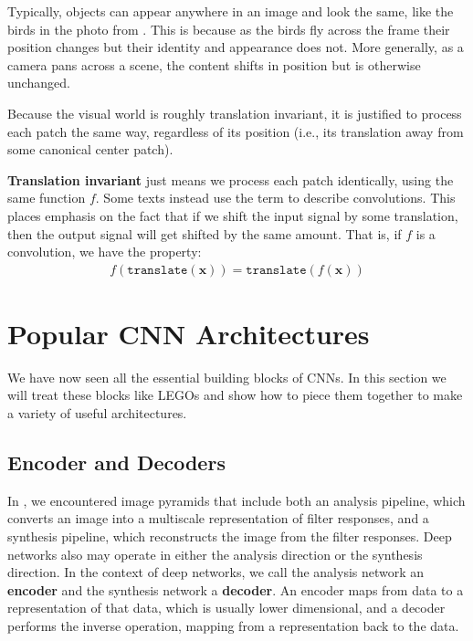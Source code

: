 Typically, objects can appear anywhere in an image and look the same, like the birds in the photo from \fig{\ref{fig:convolutional_neural_nets:CNNs_as_patch_processing}}. This is because as the birds fly across the frame their position changes but their identity and appearance does not. More generally, as a camera pans across a scene, the content shifts in position but is otherwise unchanged.

Because the visual world is roughly translation invariant, it is justified to process each patch the same way, regardless of its position (i.e., its translation away from some canonical center patch).

\textbf{Translation invariant} just means we process each patch identically, using the same function $f$. Some texts instead use the term  to describe convolutions. This places emphasis on the fact that if we shift the input signal by some translation, then the output signal will get shifted by the same amount. That is, if $f$ is a convolution, we have the property:
\begin{align}
    f(\texttt{translate}(\mathbf{x})) = \texttt{translate}(f(\mathbf{x}))
\end{align}



\section{Popular CNN Architectures}
\label{sec:convolutional_neural_nets:popular_architectures}
We have now seen all the essential building blocks of CNNs. In this section we will treat these blocks like LEGOs and show how to piece them together to make a variety of useful architectures.

\subsection{Encoder and Decoders}
In \chap{\ref{chapter:image_pyramids}}, we encountered image pyramids that include both an analysis pipeline, which converts an image into a multiscale representation of filter responses, and a synthesis pipeline, which reconstructs the image from the filter responses. Deep networks also may operate in either the analysis direction or the synthesis direction. In the context of deep networks, we call the analysis network an \textbf{encoder} and the synthesis network a \textbf{decoder}. An encoder maps from data to a representation of that data, which is usually lower dimensional, and a decoder performs the inverse operation, mapping from a representation back to the data. %

